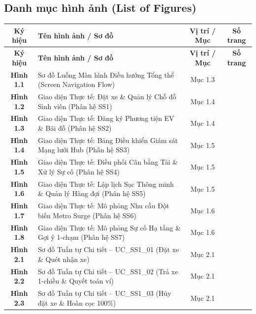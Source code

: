 \documentclass[12pt,a4paper]{article}
\begin{document}
\subsection*{Danh mục hình ảnh (List of Figures)}
\renewcommand{\arraystretch}{1.15}
\small
\begin{longtable}{|c|p{8.5cm}|c|c|}
    \hline
    \textbf{Ký hiệu} & \textbf{Tên hình ảnh / Sơ đồ} & \textbf{Vị trí / Mục} & \textbf{Số trang} \\
    \hline
    \endfirsthead
    \hline
    \textbf{Ký hiệu} & \textbf{Tên hình ảnh / Sơ đồ} & \textbf{Vị trí / Mục} & \textbf{Số trang} \\
    \hline
    \endhead
    \hline
    \endfoot
    \textbf{Hình 1.1} & Sơ đồ Luồng Màn hình Điều hướng Tổng thể (Screen Navigation Flow) & Mục 1.3 & \pageref{fig:screen-flow} \\
    \hline
    \textbf{Hình 1.2} & Giao diện Thực tế: Đặt xe \& Quản lý Chỗ đỗ Sinh viên (Phân hệ SS1) & Mục 1.4 & \pageref{fig:ui-ss1-real} \\
    \hline
    \textbf{Hình 1.3} & Giao diện Thực tế: Đăng ký Phương tiện EV \& Bãi đỗ (Phân hệ SS2) & Mục 1.4 & \pageref{fig:ui-ss2-real} \\
    \hline
    \textbf{Hình 1.4} & Giao diện Thực tế: Bảng Điều khiển Giám sát Mạng lưới Hub (Phân hệ SS3) & Mục 1.5 & \pageref{fig:ui-ss3-real} \\
    \hline
    \textbf{Hình 1.5} & Giao diện Thực tế: Điều phối Cân bằng Tải \& Xử lý Sự cố (Phân hệ SS4) & Mục 1.5 & \pageref{fig:ui-ss4-real} \\
    \hline
    \textbf{Hình 1.6} & Giao diện Thực tế: Lập lịch Sạc Thông minh \& Quản lý Hàng đợi (Phân hệ SS5) & Mục 1.5 & \pageref{fig:ui-ss5-real} \\
    \hline
    \textbf{Hình 1.7} & Giao diện Thực tế: Mô phỏng Nhu cầu Đột biến Metro Surge (Phân hệ SS6) & Mục 1.6 & \pageref{fig:ui-ss6-real} \\
    \hline
    \textbf{Hình 1.8} & Giao diện Thực tế: Mô phỏng Sự cố Hạ tầng \& Gợi ý 1-chạm (Phân hệ SS7) & Mục 1.6 & \pageref{fig:ui-ss7-real} \\
    \hline
    \textbf{Hình 2.1} & Sơ đồ Tuần tự Chi tiết -- UC\_SS1\_01 (Đặt xe \& Quét nhận xe) & Mục 2.1 & \pageref{fig:seq-ss1-01} \\
    \hline
    \textbf{Hình 2.2} & Sơ đồ Tuần tự Chi tiết -- UC\_SS1\_02 (Trả xe 1-chiều \& Quyết toán ví) & Mục 2.1 & \pageref{fig:seq-ss1-02} \\
    \hline
    \textbf{Hình 2.3} & Sơ đồ Tuần tự Chi tiết -- UC\_SS1\_03 (Hủy đặt xe \& Hoàn cọc 100\%) & Mục 2.1 & \pageref{fig:seq-ss1-03} \\

\end{longtable}
\end{document}
